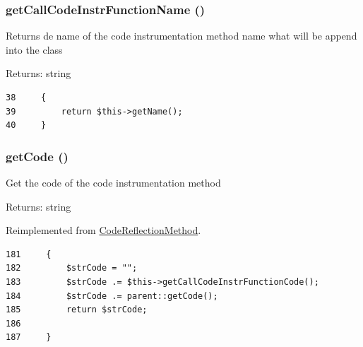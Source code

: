 \hypertarget{class_code_instrumentation_method_7f82d49e30da995729069ae9190555da}{
\subsubsection[{getCallCodeInstrFunctionName}]{\setlength{\rightskip}{0pt plus 5cm}getCallCodeInstrFunctionName ()}}
\label{class_code_instrumentation_method_7f82d49e30da995729069ae9190555da}


Returns de name of the code instrumentation method name what will be append into the class

\begin{Desc}
\item[Returns:]string \end{Desc}


\begin{Code}\begin{verbatim}38     {
39         return $this->getName();
40     }
\end{verbatim}
\end{Code}


\hypertarget{class_code_instrumentation_method_b5e24da53b4a0d0848b18c1e832f47ff}{
\subsubsection[{getCode}]{\setlength{\rightskip}{0pt plus 5cm}getCode ()}}
\label{class_code_instrumentation_method_b5e24da53b4a0d0848b18c1e832f47ff}


Get the code of the code instrumentation method

\begin{Desc}
\item[Returns:]string \end{Desc}


Reimplemented from \hyperlink{class_code_reflection_method_b5e24da53b4a0d0848b18c1e832f47ff}{CodeReflectionMethod}.

\begin{Code}\begin{verbatim}181     {
182         $strCode = "";
183         $strCode .= $this->getCallCodeInstrFunctionCode();
184         $strCode .= parent::getCode();
185         return $strCode;
186 
187     }
\end{verbatim}
\end{Code}


